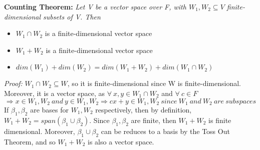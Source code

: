 \documentclass[12pt]{article}
\begin{document}
\textbf{Counting Theorem: }\emph{Let V be a vector space over F, with $W_1, W_2 \subseteq V$ finite-dimensional subsets of V. Then}
\begin{itemize}
\item $W_1 \cap W_2$ is a finite-dimensional vector space
\item $W_1 + W_2$ is a finite-dimensional vector space
\item $dim(W_1) + dim(W_2) = dim(W_1 + W_2) + dim(W_1 \cap W_2)$
\end{itemize}
\emph{Proof: }$W_1 \cap W_2 \subseteq W$, so it is finite-dimensional since W is finite-dimensional. Moreover, it is a vector space, as $\forall\ x, y \in W_1 \cap W_2$ and $\forall\ c \in F$
$$\Rightarrow x \in W_1, W_2\ and\ y \in W_1, W_2\Rightarrow cx + y \in W_1, W_2\ since\ W_1\ and\ W_2\ are\ subspaces$$  
If $\beta_1, \beta_2$ are bases for $W_1, W_2$ respectively, then by definition, $W_1 + W_2 = span(\beta_1 \cup \beta_2)$. Since $\beta_1, \beta_2$ are finite, then $W_1 + W_2$ is finite dimensional. Moreover, $\beta_1 \cup \beta_2$ can be reduces to a basis by the Toss Out Theorem, and so $W_1 + W_2$ is also a vector space.\\
\end{document}
